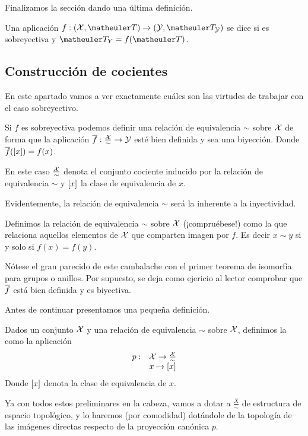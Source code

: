 Finalizamos la sección dando una última definición.
\begin{defi}[Indentificación]
	Una aplicación $f:(\X,\T)\to(\Y,\T_\Y)$ se dice  si es sobreyectiva y $\T_Y=f(\T)$.
\end{defi} 
\subsection{Construcción de cocientes}
En este apartado vamos a ver exactamente cuáles son las virtudes de trabajar con el caso sobreyectivo.

Si $f$ es sobreyectiva podemos definir una relación de equivalencia $\sim$ sobre $\mathcal{X}$ de forma que la aplicación $\overline{f}:\frac{\mathcal{X}}{\sim}\to\mathcal{Y}$ esté bien definida y sea una biyección. Donde $\overline{f}(\left [ x \right ])=f(x)$.

En este caso $\frac{\mathcal{X}}{\sim}$ denota el conjunto cociente inducido por la relación de equivalencia $\sim$ y $\left [ x \right ]$ la clase de equivalencia de $x$.

Evidentemente, la relación de equivalencia $\sim$ será la inherente a la inyectividad.
\begin{defi}
	Definimos la relación de equivalencia $\sim$ sobre $\mathcal{X}$ (¡compruébese!) como la que relaciona aquellos elementos de $\mathcal{X}$ que comparten imagen por $f$. Es decir $x\sim y$ si y solo si $f(x)=f(y)$.
\end{defi}
Nótese el gran parecido de este cambalache con el primer teorema de isomorfía para grupos o anillos. Por supuesto, se deja como ejericio al lector comprobar que $\overline{f}$ está bien definida y es biyectiva.

Antes de continuar presentamos una pequeña definición.
\begin{defi}
	Dados un conjunto $\mathcal{X}$ y una relación de equivalencia $\sim$ sobre $\mathcal{X}$, definimos la  como la aplicación
	\[\begin{array}{cc}
	p:&\mathcal{X}\to\frac{\mathcal{X}}{\sim}\\
	&x\mapsto\left [ x \right ]
	\end{array}\]
	Donde $\left [ x \right ]$ denota la clase de equivalencia de $x$.
\end{defi}
Ya con todos estos preliminares en la cabeza, vamos a dotar a $\frac{X}{\sim}$ de estructura de espacio topológico, y lo haremos (por comodidad) dotándole de la topología de las imágenes directas respecto de la proyección canónica $p$.

